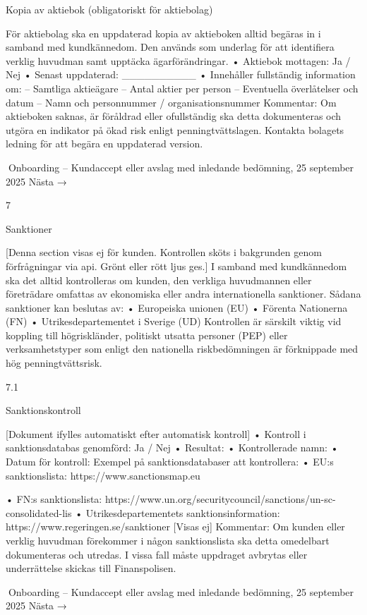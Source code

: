 Kopia av aktiebok (obligatoriskt för aktiebolag)

För aktiebolag ska en uppdaterad kopia av aktieboken alltid begäras in i samband med
kundkännedom. Den används som underlag för att identifiera verklig huvudman samt
upptäcka ägarförändringar.
• Aktiebok mottagen: Ja / Nej
• Senast uppdaterad: __________
• Innehåller fullständig information om:
– Samtliga aktieägare
– Antal aktier per person
– Eventuella överlåtelser och datum
– Namn och personnummer / organisationsnummer
Kommentar:
Om aktieboken saknas, är föråldrad eller ofullständig ska detta dokumenteras och
utgöra en indikator på ökad risk enligt penningtvättslagen. Kontakta bolagets ledning för att begära en uppdaterad version.

Onboarding – Kundaccept eller avslag med inledande bedömning,
25 september 2025
Nästa →

7

Sanktioner

[Denna section visas ej för kunden. Kontrollen sköts i bakgrunden genom förfrågningar
via api. Grönt eller rött ljus ges.]
I samband med kundkännedom ska det alltid kontrolleras om kunden, den verkliga huvudmannen eller företrädare omfattas av ekonomiska eller andra internationella sanktioner.
Sådana sanktioner kan beslutas av:
• Europeiska unionen (EU)
• Förenta Nationerna (FN)
• Utrikesdepartementet i Sverige (UD)
Kontrollen är särskilt viktig vid koppling till högriskländer, politiskt utsatta personer
(PEP) eller verksamhetstyper som enligt den nationella riskbedömningen är förknippade
med hög penningtvättsrisk.

7.1

Sanktionskontroll

[Dokument ifylles automatiskt efter automatisk kontroll]
• Kontroll i sanktionsdatabas genomförd: Ja / Nej
• Resultat:
• Kontrollerade namn:
• Datum för kontroll:
Exempel på sanktionsdatabaser att kontrollera:
• EU:s sanktionslista: https://www.sanctionsmap.eu

• FN:s sanktionslista: https://www.un.org/securitycouncil/sanctions/un-sc-consolidated-lis
• Utrikesdepartementets sanktionsinformation: https://www.regeringen.se/sanktioner
[Visas ej]
Kommentar:
Om kunden eller verklig huvudman förekommer i någon sanktionslista ska detta
omedelbart dokumenteras och utredas. I vissa fall måste uppdraget avbrytas eller
underrättelse skickas till Finanspolisen.

Onboarding – Kundaccept eller avslag med inledande bedömning,
25 september 2025
Nästa →

